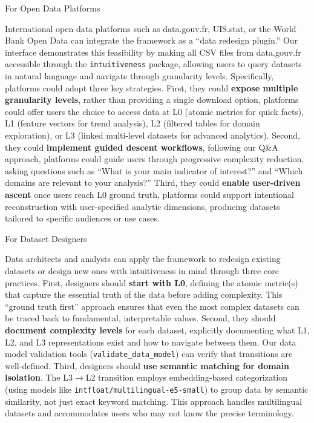 \documentclass[]{hdsr}
\makeatletter
\def\subsubsection{\@startsection{subsubsection}{3}%
  \z@{.5\linespacing\@plus.7\linespacing}{.5\linespacing}%
  {\normalfont\bfseries}}
\theoremstyle{plain}      %
\theoremstyle{definition} %
\theoremstyle{remark}     %
\makeatother
\begin{document}
\subsubsection{For Open Data Platforms}

International open data platforms such as data.gouv.fr, UIS.stat, or the World Bank Open Data can integrate the framework as a ``data redesign plugin.'' Our interface demonstrates this feasibility by making all CSV files from data.gouv.fr accessible through the \texttt{intuitiveness} package, allowing users to query datasets in natural language and navigate through granularity levels. Specifically, platforms could adopt three key strategies. First, they could \textbf{expose multiple granularity levels}, rather than providing a single download option, platforms could offer users the choice to access data at L0 (atomic metrics for quick facts), L1 (feature vectors for trend analysis), L2 (filtered tables for domain exploration), or L3 (linked multi-level datasets for advanced analytics). Second, they could \textbf{implement guided descent workflows}, following our Q\&A approach, platforms could guide users through progressive complexity reduction, asking questions such as ``What is your main indicator of interest?'' and ``Which domains are relevant to your analysis?'' Third, they could \textbf{enable user-driven ascent} once users reach L0 ground truth, platforms could support intentional reconstruction with user-specified analytic dimensions, producing datasets tailored to specific audiences or use cases.

\subsubsection{For Dataset Designers}

Data architects and analysts can apply the framework to redesign existing datasets or design new ones with intuitiveness in mind through three core practices. First, designers should \textbf{start with L0}, defining the atomic metric(s) that capture the essential truth of the data before adding complexity. This ``ground truth first'' approach ensures that even the most complex datasets can be traced back to fundamental, interpretable values. Second, they should \textbf{document complexity levels} for each dataset, explicitly documenting what L1, L2, and L3 representations exist and how to navigate between them. Our data model validation tools (\texttt{validate\_data\_model}) can verify that transitions are well-defined. Third, designers should \textbf{use semantic matching for domain isolation}. The L3$\to$L2 transition employs embedding-based categorization (using models like \texttt{intfloat/multilingual-e5-small}) to group data by semantic similarity, not just exact keyword matching. This approach handles multilingual datasets and accommodates users who may not know the precise terminology.
\end{document}
